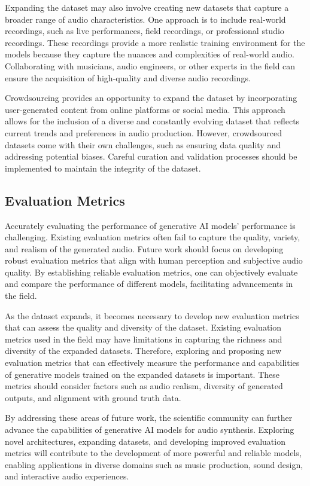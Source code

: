 Expanding the dataset may also involve creating new datasets that capture a broader range of audio characteristics. One approach is to include real-world recordings, such as live performances, field recordings, or professional studio recordings. These recordings provide a more realistic training environment for the models because they capture the nuances and complexities of real-world audio. Collaborating with musicians, audio engineers, or other experts in the field can ensure the acquisition of high-quality and diverse audio recordings.

Crowdsourcing provides an opportunity to expand the dataset by incorporating user-generated content from online platforms or social media. This approach allows for the inclusion of a diverse and constantly evolving dataset that reflects current trends and preferences in audio production. However, crowdsourced datasets come with their own challenges, such as ensuring data quality and addressing potential biases. Careful curation and validation processes should be implemented to maintain the integrity of the dataset.

\subsection{Evaluation Metrics}

Accurately evaluating the performance of generative \ac{AI} models' performance is challenging. Existing evaluation metrics often fail to capture the quality, variety, and realism of the generated audio. Future work should focus on developing robust evaluation metrics that align with human perception and subjective audio quality. By establishing reliable evaluation metrics, one can objectively evaluate and compare the performance of different models, facilitating advancements in the field.

As the dataset expands, it becomes necessary to develop new evaluation metrics that can assess the quality and diversity of the dataset. Existing evaluation metrics used in the field may have limitations in capturing the richness and diversity of the expanded datasets. Therefore, exploring and proposing new evaluation metrics that can effectively measure the performance and capabilities of generative models trained on the expanded datasets is important. These metrics should consider factors such as audio realism, diversity of generated outputs, and alignment with ground truth data.

By addressing these areas of future work, the scientific community can further advance the capabilities of generative \ac{AI} models for audio synthesis. Exploring novel architectures, expanding datasets, and developing improved evaluation metrics will contribute to the development of more powerful and reliable models, enabling applications in diverse domains such as music production, sound design, and interactive audio experiences.

